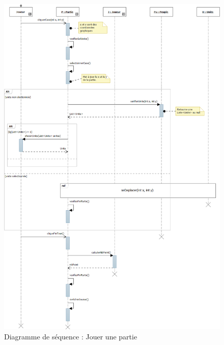 \documentclass[a4paper,11pt]{article}
\begin{document}
\begin{figure}[H]
	\centering
	\includegraphics[width=\textwidth]{fig/diagramme_sequence_jouerTour}
	\caption{Diagramme de séquence : Jouer une partie}
	\label{ds:jp}
\end{figure} 
\end{document}
